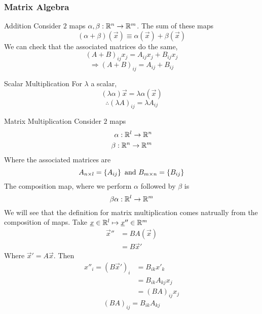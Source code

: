 \documentclass{article}
\numberwithin{equation}{section}
\begin{document}
\subsubsection{Matrix Algebra}
\begin{enumdescript}
    \item[Addition] Consider $2$ maps $\alpha, \beta: \mathbb{R}^n \rightarrow \mathbb{R}^m$.
    The sum of these maps 
    \[
        (\alpha + \beta)(\vec x) \equiv \alpha(\vec x) + \beta(\vec x)  
    \]
    We can check that the associated matrices do the same,
    \[
        (A+ B)_{ij}x_j = A_{ij}x_j + B_{ij}x_j
    \]
    \begin{equation}\label{eq:3-11}
        \Rightarrow (A + B)_{ij} = A_{ij} + B_{ij}
    \end{equation}
    \item[Scalar Multiplication] For $\lambda$ a scalar,
    \[
        (\lambda \alpha)\vec x = \lambda \alpha(\vec x)
    \]
    \begin{equation}\label{eq:3-12}
        \therefore (\lambda A)_{ij} = \lambda A_{ij}
    \end{equation}
    \item[Matrix Multiplication] Consider $2$ maps
    \begin{align*}
        \alpha: \mathbb{R}^l \rightarrow \mathbb{R}^n \\
        \beta: \mathbb{R}^n \rightarrow \mathbb{R}^m
    \end{align*}
    Where the associated matrices are
    \[
        A_{n \times l} = \left\{ A_{ij} \right\} \text{ and } B_{m \times n} = \left\{ B_{ij} \right\}
    \]
    The composition map, where we perform $\alpha$ followed by $\beta$ is
    \[
        \beta\alpha: \mathbb{R}^l \rightarrow \mathbb{R}^m  
    \]
    We will see that the definition for matrix multiplication comes natrually from the composition of maps.
    Take $\underline{x} \in \mathbb{R}^l \mapsto \underline{x}'' \in \mathbb{R}^m$
    \begin{align*}
        \vec x'' &= BA(\vec x) \\
        &= B\vec x'
    \end{align*}
    Where $\vec x' = A\vec x$. Then
    \begin{align*}
        x''_i = (B\vec x')_i &= B_{ik}x'_k \\
        &= B_{ik}A_{kj}x_j \\
        &= (BA)_{ij}x_j
    \end{align*}
    \begin{equation}\label{eq:3-13}
        (BA)_{ij} = B_{ik}A_{kj}
    \end{equation}

\end{enumdescript}
\end{document}
